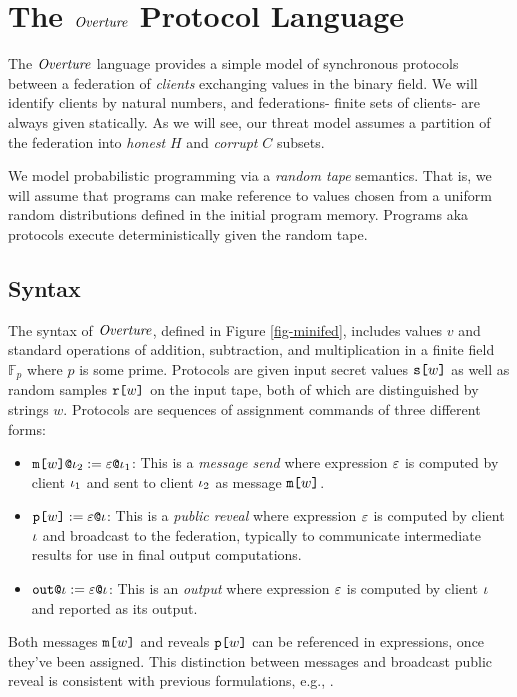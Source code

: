 \section{The $\mathit{Overture}$ Protocol Language}
\label{section-lang}

\minifedfig

The $\mathit{Overture}$ language provides a simple model of synchronous
protocols between a federation of \emph{clients} exchanging values in
the binary field. We will identify clients by natural numbers, and
federations- finite sets of clients- are always given statically.
As we will see, our threat model assumes a partition of the federation
into \emph{honest} $H$ and \emph{corrupt} $C$ subsets.

We model probabilistic programming via a \emph{random tape}
semantics. That is, we will assume that programs can make reference to
values chosen from a uniform random distributions defined in the
initial program memory.  Programs aka protocols execute
deterministically given the random tape.

\subsection{Syntax} The syntax of $\mathit{Overture}$, defined in
Figure \ref{fig-minifed}, includes values $v$ and standard
operations of addition, subtraction, and multiplication in
a finite field $\mathbb{F}_p$ where $p$ is some prime. 
Protocols are given input secret values $\texttt{s[}w\texttt{]}$
as well as random samples $\texttt{r[}w\texttt{]}$ on the input
tape, both of which are distinguished by
strings $w$. Protocols are sequences of assignment
commands of three different forms:
\begin{itemize}
\item $\texttt{m[}w\texttt{]}\texttt{@}\iota_2 := \varepsilon\texttt{@}\iota_1$: This
  is a \emph{message send} where expression $\varepsilon$ is computed
  by client $\iota_1$ and sent to client $\iota_2$ as message
  $\texttt{m[}w\texttt{]}$.
\item $\texttt{p[}w\texttt{]} := \varepsilon\texttt{@}\iota$: This
  is a \emph{public reveal} where expression $\varepsilon$ is computed
  by client $\iota$ and broadcast to the federation, typically
  to communicate intermediate results for use in final output
  computations.
\item $\texttt{out}\texttt{@}\iota := \varepsilon\texttt{@}\iota$: This
  is an \emph{output} where expression $\varepsilon$ is computed
  by client $\iota$ and reported as its output.
\end{itemize}
Both messages $\texttt{m[}w\texttt{]}$ and reveals $\texttt{p[}w\texttt{]}$ can be
referenced in expressions, once they've been assigned.
This distinction between messages and broadcast public
reveal is consistent with previous formulations, e.g.,
\cite{6266151}.

